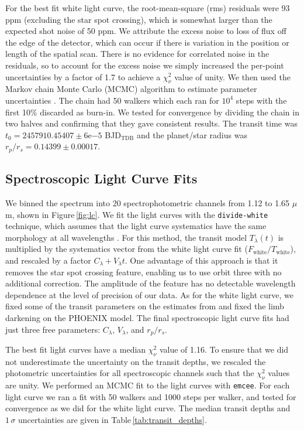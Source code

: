 \documentclass[twocolumn]{aastex61}
\begin{document}
For the best fit white light curve, the root-mean-square (rms) residuals were 93 ppm (excluding the star spot crossing), which is somewhat larger than the expected shot noise of 50 ppm. We attribute the excess noise to loss of flux off the edge of the detector, which can occur if there is variation in the position or length of the spatial scan. There is no evidence for correlated noise in the residuals, so to account for the excess noise we simply increased the per-point uncertainties by a factor of 1.7 to achieve a $\chi^2_\nu$ value of unity.  We then used the Markov chain Monte Carlo (MCMC) algorithm to estimate parameter uncertainties \citep{foremanmackey13}.  The chain had 50 walkers which each ran for $10^4$ steps with the first 10\% discarded as burn-in. We tested for convergence by dividing the chain in two halves and confirming that they gave consistent results. The transit time was $t_0 = 2457910.45407\pm6\mathrm{e}{-5}$ BJD$_\mathrm{TDB}$ and the planet/star radius was $r_p/r_s = 0.14399\pm0.00017$. 

\subsection{Spectroscopic Light Curve Fits}
We binned the spectrum into 20 spectrophotometric channels from 1.12 to 1.65 $\mu$m, shown in Figure\,\ref{fig:lc}. We fit the light curves with the \texttt{divide-white} technique, which assumes that the light curve systematics have the same morphology at all wavelengths \citep{stevenson14c, kreidberg14a}. For this method, the transit model $T_\lambda(t)$ is multiplied by the systematics vector from the white light curve fit ($F_\mathrm{white}/T_\mathrm{white}$), and rescaled by a factor $C_\lambda + V_\lambda t$.  One advantage of this approach is that it removes the star spot crossing feature, enabling us to use orbit three with no additional correction. The amplitude of the feature has no detectable wavelength dependence at the level of precision of our data.  As for the white light curve, we fixed some of the transit parameters on the estimates from \cite{dai17} and fixed the limb darkening on the PHOENIX model. The final spectroscopic light curve fits had just three free parameters: $C_\lambda$, $V_\lambda$, and $r_p/r_s$.  

The best fit light curves have a median $\chi^2_\nu$ value of 1.16.  To ensure that we did not underestimate the uncertainty on the transit depths, we rescaled the photometric uncertainties for all spectroscopic channels such that the $\chi^2_\nu$ values are unity. We performed an MCMC fit to the light curves with \texttt{emcee}.  For each light curve we ran a fit with 50 walkers and 1000 steps per walker, and tested for convergence as we did for the white light curve. The median transit depths and $1\,\sigma$ uncertainties are given in Table\,\ref{tab:transit_depths}. 
\end{document}
